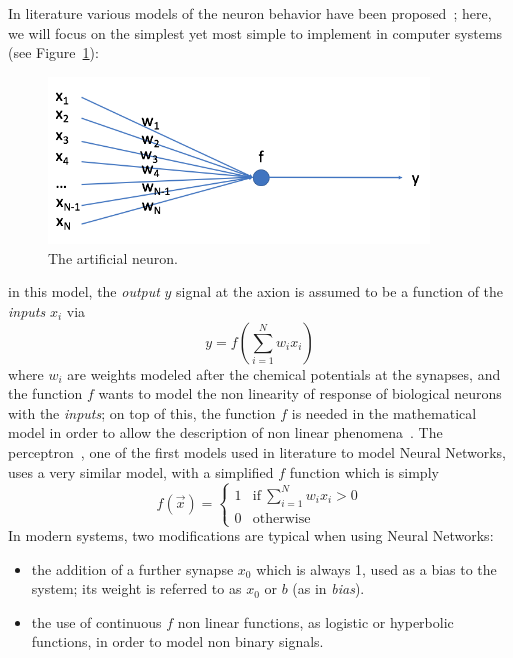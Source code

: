  In literature various models of the neuron behavior have been proposed~\cite{Hodgkin1952, Gerstner2002}; 
 here, we will focus on the simplest yet most simple to implement in computer systems~\cite{neuronWiki} (see Figure~\ref{fig:artificialneuron}): %
 \begin{figure}[h]
    \centering
    \hfill
        \includegraphics[width=0.9\textwidth]{images/artificialneuron.png}
     \caption{The artificial neuron.}
     \label{fig:artificialneuron}

\end{figure}
 in this model, the \emph{output} $y$ signal at the axion is assumed to be a function of the \emph{inputs} $x_i$ via
 \begin{equation}
   y = f\left(\sum_{i=1}^{N} w_i x_i\right)
   \label{eq:artificialneuron}
 \end{equation}
where $w_i$ are weights modeled after the chemical potentials at the synapses, and the function $f$ wants to model the non linearity of response of biological neurons with the \emph{inputs}; on top of this, the function $f$ is needed in the mathematical model in order to allow the description of non linear phenomena~\cite{Hornik1991}. The perceptron~\cite{Rosenblatt1958}, one of the first models used in literature to model Neural Networks, uses a very similar model, with a simplified $f$ function which is simply
\begin{equation}
  f(\vec{x})= \begin{cases}
                1 &  \text{if}\  \sum_{i=1}^{N} w_i x_i >0 \\
                0 &  \text{otherwise}
              \end{cases}
\end{equation}
In modern systems, two  modifications are typical when using Neural Networks:
\begin{itemize}
\item the addition of a further synapse $x_0$ which is always 1, used as a bias to the system; its weight is referred to as $x_0$ or $b$ (as in \emph{bias}).
\item the use of continuous $f$ non linear functions, as  logistic or hyperbolic~\cite{logistic} functions, in order to model non binary signals.
\end{itemize}
